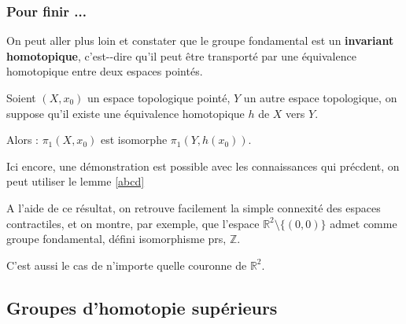 \subsubsection{Pour finir ...}

On peut aller plus loin et constater que le groupe fondamental est un \textbf{invariant homotopique}, %
c'est--dire qu'il peut \^etre transport\'e par une \'equivalence homotopique entre deux espaces point\'es.

\begin{prop}
Soient $(X,x_0)$ un espace topologique point\'e, $Y$ un autre espace topologique, on suppose qu'il existe une \'equivalence homotopique $h$ de $X$ vers $Y$.

Alors : $\pi_1(X,x_0)$ est isomorphe  $\pi_1(Y,h(x_0))$.
\end{prop}

Ici encore, une d\'emonstration est possible avec les connaissances qui pr\'ecdent, %
on peut utiliser le lemme \ref{abcd}

\par
A l'aide de ce r\'esultat, on retrouve facilement la simple connexit\'e des espaces contractiles, %
et on montre, par exemple, que l'espace $\mathbb{R}^2\setminus\{(0,0)\}$ admet comme groupe fondamental, d\'efini  isomorphisme prs, $\mathbb{Z}$.

\par
C'est aussi le cas de n'importe quelle couronne de $\mathbb{R}^2$.

\subsection{Groupes d'homotopie sup\'erieurs}











